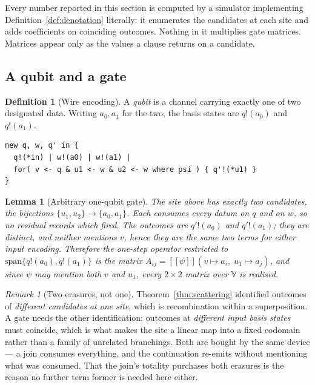 \documentclass[11pt,a4paper]{article}
\theoremstyle{plain}
\newtheorem{lemma}[theorem]{Lemma}
\theoremstyle{definition}
\newtheorem{definition}[theorem]{Definition}
\theoremstyle{remark}
\newtheorem{remark}[theorem]{Remark}
\newcommand{\sem}[1]{[\![#1]\!]}
\newcommand{\V}{\mathbb{V}}
\begin{document}
Every number reported in this section is computed by a simulator implementing
Definition~\ref{def:denotation} literally: it enumerates the candidates at each
site and adds coefficients on coinciding outcomes. Nothing in it multiplies gate
matrices. Matrices appear only as the values a clause returns on a candidate.

\subsection{A qubit and a gate}\label{ssec:gadget}

\begin{definition}[Wire encoding]\label{def:wire}
A \emph{qubit} is a channel carrying exactly one of two designated data. Writing
$a_0,a_1$ for the two, the basis states are $q!(a_0)$ and $q!(a_1)$.
\end{definition}

\begin{lstlisting}
new q, w, q' in {
  q!(*in) | w!(a0) | w!(a1) |
  for( v <- q & u1 <- w & u2 <- w where psi ) { q'!(*u1) }
}
\end{lstlisting}

\begin{lemma}[Arbitrary one-qubit gate]\label{lem:1q}
The site above has exactly two candidates, the bijections
$\{u_1,u_2\} \to \{a_0,a_1\}$. Each consumes every datum on $q$ and on $w$, so
no residual records which fired. The outcomes are $q'!(a_0)$ and $q'!(a_1)$;
they are distinct, and neither mentions $v$, hence they are the \emph{same two
terms} for either input encoding. Therefore the one-step operator restricted to
$\mathrm{span}\{q!(a_0), q!(a_1)\}$ is the matrix
$A_{ij} = \sem{\psi}(v \mapsto a_i,\; u_1 \mapsto a_j)$, and since $\psi$ may
mention both $v$ and $u_1$, every $2\times 2$ matrix over $\V$ is realised.
\end{lemma}

\begin{remark}[Two erasures, not one]\label{rem:twoerasures}
Theorem~\ref{thm:scattering} identified outcomes of \emph{different candidates at
one site}, which is recombination within a superposition. A gate needs the other
identification: outcomes at \emph{different input basis states} must coincide,
which is what makes the site a linear map into a fixed codomain rather than a
family of unrelated branchings. Both are bought by the same device --- a join
consumes everything, and the continuation re-emits without mentioning what was
consumed. That the join's totality purchases both erasures is the reason no
further term former is needed here either.
\end{remark}
\end{document}
